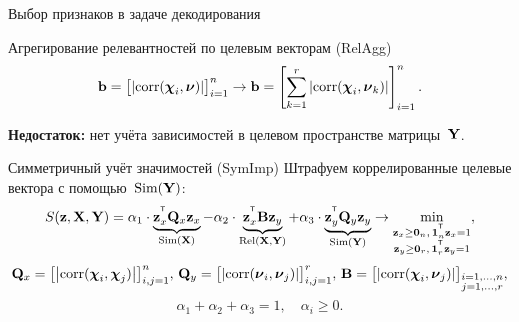 \documentclass[10pt]{beamer}
\begin{document}
\begin{frame}{Выбор признаков в задаче декодирования}
	\begin{block}{Агрегирование релевантностей по целевым векторам (RelAgg)}
	\vspace{-0.2cm}
	\[
		\mathbf{b} = \bigl[\left|\text{corr}(\boldsymbol{\chi}_i, \boldsymbol{\nu})\right|\bigr]_{i=1}^n \rightarrow \mathbf{b} = \left[\sum_{k=1}^r\left|\text{corr}(\boldsymbol{\chi}_i, \boldsymbol{\nu}_k)\right|\right]_{i=1}^n.
	\]
	\end{block}
	{\bf Недостаток:} нет учёта зависимостей в целевом пространстве матрицы~$\mathbf{Y}$. 
	
	\begin{block}{Симметричный учёт значимостей (SymImp)}
	Штрафуем коррелированные целевые вектора с помощью~$\text{Sim} (\mathbf{Y})$:
	\[
	S(\mathbf{z}, \mathbf{X}, \mathbf{Y}) = \alpha_1 \cdot \underbrace{\mathbf{z}_x^{^{\text{\tiny\sffamily\upshape\mdseries T}}} \mathbf{Q}_x \mathbf{z}_x}_{\text{Sim}(\mathbf{X})} - \alpha_2 \cdot \underbrace{\mathbf{z}_x^{^{\text{\tiny\sffamily\upshape\mdseries T}}} \mathbf{B} \mathbf{z}_y}_{\text{Rel}(\mathbf{X}, \mathbf{Y})} + \alpha_3 \cdot \underbrace{\mathbf{z}_y^{^{\text{\tiny\sffamily\upshape\mdseries T}}} \mathbf{Q}_y \mathbf{z}_y}_{\text{Sim}(\mathbf{Y})} \rightarrow \min_{\substack{\mathbf{z}_x \geq \boldsymbol{0}_n, \, \boldsymbol{1}_n^{^{\text{\tiny\sffamily\upshape\mdseries T}}}\mathbf{z}_x=1 \\ \mathbf{z}_y \geq \boldsymbol{0}_r, \, \boldsymbol{1}_r^{^{\text{\tiny\sffamily\upshape\mdseries T}}}\mathbf{z}_y=1}},
	\]
	\[
	\mathbf{Q}_x = \bigl[ \left| \text{corr}(\boldsymbol{\chi}_i, \boldsymbol{\chi}_j) \right| \bigr]_{i,j=1}^n, \,
	\mathbf{Q}_y = \bigl[ \left| \text{corr}(\boldsymbol{\nu}_i, \boldsymbol{\nu}_j) \right| \bigr]_{i,j=1}^r, \,
	\mathbf{B} =  \bigl[ \left| \text{corr}(\boldsymbol{\chi}_i, \boldsymbol{\nu}_j) \right| \bigr]_{\substack{i=1, \dots, n \\ j=1, \dots, r}},
	\]
	\[
	\alpha_1 + \alpha_2 + \alpha_3 = 1, \quad \alpha_i \geq 0.
	\] 
	\end{block}
\end{frame}
\end{document}
